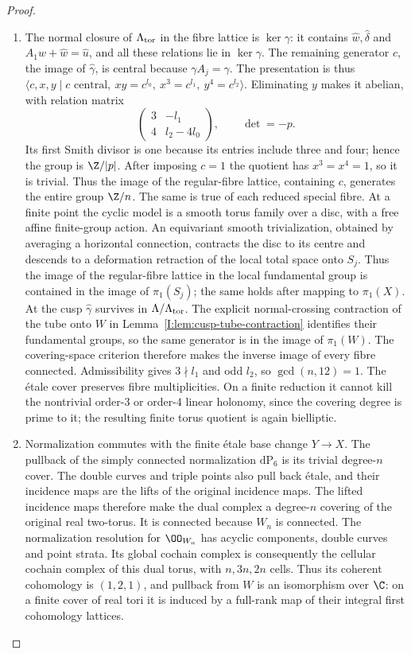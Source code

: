 \begin{proof}
\begin{enumerate}[label=\arabic*.,leftmargin=*]
\item The normal closure of $\Lambda_{\rm tor}$ in the fibre lattice is
$\ker\gamma$: it contains $\hat w,\hat\delta$ and
$A_1\hat w+\hat w=\hat u$, and all these relations lie in
$\ker\gamma$. The remaining generator $c$, the image of
$\hat\gamma$, is central because $\gamma A_j=\gamma$.
The presentation is thus
$\langle c,x,y\mid c\text{ central},\ xy=c^{l_0},\
x^3=c^{l_1},\ y^4=c^{l_2}\rangle$.
Eliminating $y$ makes it abelian, with relation matrix
\[
 \begin{pmatrix}3&-l_1\\4&l_2-4l_0\end{pmatrix},
 \qquad\det=-p.
\]
Its first Smith divisor is one because its entries include three
and four; hence the group is $\Z/|p|$.
After imposing $c=1$ the quotient has $x^3=x^4=1$, so it is trivial.
Thus the image of the regular-fibre lattice, containing $c$, generates
the entire group $\Z/n$. The same is true of each reduced special
fibre. At a finite point the cyclic model is a smooth torus family
over a disc, with a free affine finite-group action. An equivariant
smooth trivialization, obtained by averaging a horizontal connection,
contracts the disc to its centre and descends to a deformation
retraction of the local total space onto $S_j$. Thus the image of
the regular-fibre lattice in the local fundamental group is contained
in the image of $\pi_1(S_j)$; the same holds after mapping to
$\pi_1(X)$. At the cusp $\hat\gamma$ survives in
$\Lambda/\Lambda_{\rm tor}$. The explicit normal-crossing contraction
of the tube onto $W$ in Lemma~\ref{I:lem:cusp-tube-contraction} identifies their fundamental groups,
so the same generator is in the image of $\pi_1(W)$.
The covering-space criterion therefore makes the inverse image of
every fibre connected. Admissibility gives $3\nmid l_1$ and odd $l_2$,
so $\gcd(n,12)=1$. The \'etale cover preserves fibre multiplicities.
On a finite reduction it cannot kill the nontrivial order-$3$ or
order-$4$ linear holonomy, since the covering degree is prime to it;
the resulting finite torus quotient is again bielliptic.

\item Normalization commutes with the finite \'etale base change $Y\to X$.
The pullback of the simply connected normalization $\mathrm{dP}_6$
is its trivial degree-$n$ cover. The double curves and triple points
also pull back \'etale, and their incidence maps are the lifts of the
original incidence maps. The lifted incidence maps therefore make the dual complex a
degree-$n$ covering of the original real two-torus. It is connected because
$W_n$ is connected. The normalization resolution for $\OO_{W_n}$
has acyclic components, double curves and point strata. Its global
cochain complex is consequently the cellular cochain complex of this
dual torus, with $n,3n,2n$ cells. Thus its coherent cohomology is
$(1,2,1)$, and pullback from $W$ is an isomorphism over $\C$:
on a finite cover of real tori it is induced by a full-rank map of
their integral first cohomology lattices.


\end{enumerate}
\end{proof}
